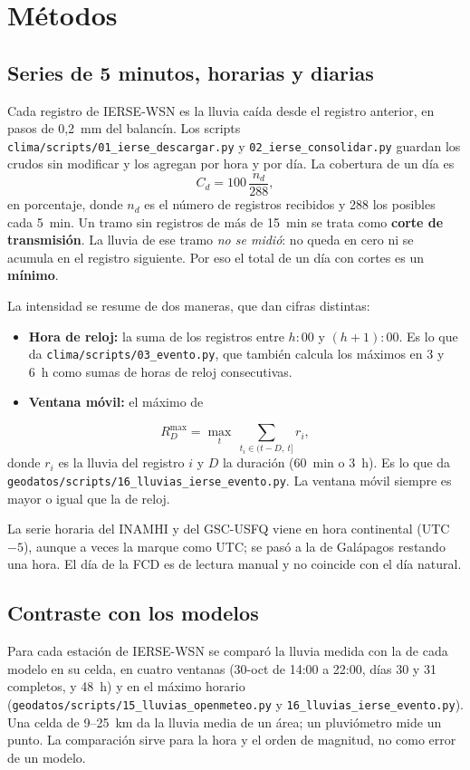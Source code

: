 \documentclass{sosg-informe}
\begin{document}
\section{Métodos}

\subsection{Series de 5 minutos, horarias y diarias}\label{sec:series}
Cada registro de IERSE-WSN es la lluvia caída desde el registro anterior, en pasos de 0,2~mm del balancín. Los scripts \texttt{clima/scripts/01\_ierse\_descargar.py} y \texttt{02\_ierse\_consolidar.py} guardan los crudos sin modificar y los agregan por hora y por día. La cobertura de un día es
\begin{equation}
  C_d = 100\,\frac{n_d}{288},
\end{equation}
en porcentaje, donde $n_d$ es el número de registros recibidos y 288 los posibles cada 5~min. Un tramo sin registros de más de 15~min se trata como \textbf{corte de transmisión}. La lluvia de ese tramo \emph{no se midió}: no queda en cero ni se acumula en el registro siguiente. Por eso el total de un día con cortes es un \textbf{mínimo}.

La intensidad se resume de dos maneras, que dan cifras distintas:
\begin{itemize}
  \item \textbf{Hora de reloj:} la suma de los registros entre $h{:}00$ y $(h+1){:}00$. Es lo que da \texttt{clima/scripts/03\_evento.py}, que también calcula los máximos en 3 y 6~h como sumas de horas de reloj consecutivas.
  \item \textbf{Ventana móvil:} el máximo de
\end{itemize}
\begin{equation}
  R_D^{\max} = \max_{t}\ \sum_{t_i \in (t-D,\ t]} r_i ,
\end{equation}
donde $r_i$ es la lluvia del registro $i$ y $D$ la duración (60~min o 3~h). Es lo que da \texttt{geodatos/scripts/16\_lluvias\_ierse\_evento.py}. La ventana móvil siempre es mayor o igual que la de reloj.

La serie horaria del INAMHI y del GSC-USFQ viene en hora continental (UTC$-5$), aunque a veces la marque como UTC; se pasó a la de Galápagos restando una hora. El día de la FCD es de lectura manual y no coincide con el día natural.

\subsection{Contraste con los modelos}
Para cada estación de IERSE-WSN se comparó la lluvia medida con la de cada modelo en su celda, en cuatro ventanas (30-oct de 14:00 a 22:00, días 30 y 31 completos, y 48~h) y en el máximo horario (\texttt{geodatos/scripts/15\_lluvias\_openmeteo.py} y \texttt{16\_lluvias\_ierse\_evento.py}). Una celda de 9--25~km da la lluvia media de un área; un pluviómetro mide un punto. La comparación sirve para la hora y el orden de magnitud, no como error de un modelo.
\end{document}
